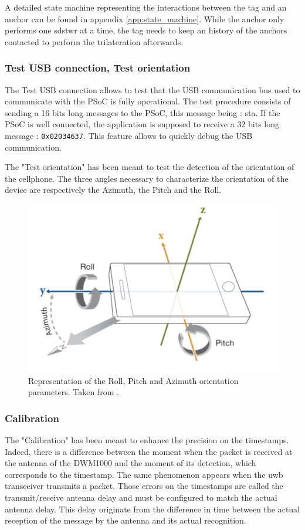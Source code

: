 A detailed state machine representing the interactions between the tag and an anchor can be found in appendix \ref{app:state_machine}. While the anchor only performs one \gls{sdstwr} at a time, the tag needs to keep an history of the anchors contacted to perform the trilateration afterwards.

\subsubsection{Test USB connection, Test orientation}
\label{usb_con}

The Test USB connection allows to test that the USB communication bus used to communicate with the PSoC is fully operational. The test procedure consists of sending a 16 bits long messages to the PSoC, this message being : sta. If the PSoC is well connected, the application is supposed to receive a 32 bits long message : \texttt{0x02034637}. This feature allows to quickly debug the USB communication.
\vspace{2mm}

The "Test orientation" has been meant to test the detection of the orientation of the cellphone. The three angles necessary to characterize the orientation of the device are respectively the Azimuth, the Pitch and the Roll.

\begin{figure}[H]
\centering
\includegraphics[width=.6\linewidth]{Images/angles_gsm.png}
\caption{Representation of the Roll, Pitch and Azimuth orientation parameters. Taken from \cite{mathworks}.}
\end{figure}

\subsubsection{Calibration}

The "Calibration" has been meant to enhance the precision on the timestamps. Indeed, there is a difference between the moment when the packet is received at the antenna of the DWM1000 and the moment of its detection, which corresponds to the timestamp. The same phenomenon appears when the \gls{uwb} transceiver transmits a packet. Those errors on the timestamps are called the transmit/receive antenna delay and must be configured to match the actual antenna delay. This delay originate from the difference in time between the actual reception of the message by the antenna and its actual recognition.


